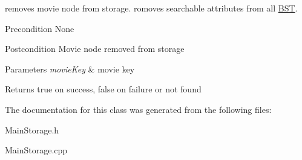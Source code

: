 removes movie node from storage. romoves searchable attributes from all \hyperlink{class_b_s_t}{B\+ST}. \begin{DoxyPrecond}{Precondition}
None 
\end{DoxyPrecond}
\begin{DoxyPostcond}{Postcondition}
Movie node removed from storage 
\end{DoxyPostcond}

\begin{DoxyParams}{Parameters}
{\em movie\+Key} & movie key \\
\hline
\end{DoxyParams}
\begin{DoxyReturn}{Returns}
true on success, false on failure or not found 
\end{DoxyReturn}


The documentation for this class was generated from the following files\+:\begin{DoxyCompactItemize}
\item 
Main\+Storage.\+h\item 
Main\+Storage.\+cpp\end{DoxyCompactItemize}
